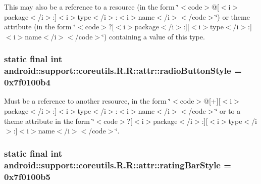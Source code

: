 This may also be a reference to a resource (in the form \char`\"{}$<$code$>$@\mbox{[}$<$i$>$package$<$/i$>$:\mbox{]}$<$i$>$type$<$/i$>$:$<$i$>$name$<$/i$>$$<$/code$>$\char`\"{}) or theme attribute (in the form \char`\"{}$<$code$>$?\mbox{[}$<$i$>$package$<$/i$>$:\mbox{]}\mbox{[}$<$i$>$type$<$/i$>$:\mbox{]}$<$i$>$name$<$/i$>$$<$/code$>$\char`\"{}) containing a value of this type. \hypertarget{classandroid_1_1support_1_1coreutils_1_1_r_1_1attr_57f616b66aedc31fe360f1557f94f519}{
\subsubsection[{radioButtonStyle}]{\setlength{\rightskip}{0pt plus 5cm}static final int android::support::coreutils.R.R::attr::radioButtonStyle = 0x7f0100b4}}
\label{classandroid_1_1support_1_1coreutils_1_1_r_1_1attr_57f616b66aedc31fe360f1557f94f519}


Must be a reference to another resource, in the form \char`\"{}$<$code$>$@\mbox{[}+\mbox{]}\mbox{[}$<$i$>$package$<$/i$>$:\mbox{]}$<$i$>$type$<$/i$>$:$<$i$>$name$<$/i$>$$<$/code$>$\char`\"{} or to a theme attribute in the form \char`\"{}$<$code$>$?\mbox{[}$<$i$>$package$<$/i$>$:\mbox{]}\mbox{[}$<$i$>$type$<$/i$>$:\mbox{]}$<$i$>$name$<$/i$>$$<$/code$>$\char`\"{}. \hypertarget{classandroid_1_1support_1_1coreutils_1_1_r_1_1attr_d2d3d429fd870d9daf633e1f2402963b}{
\subsubsection[{ratingBarStyle}]{\setlength{\rightskip}{0pt plus 5cm}static final int android::support::coreutils.R.R::attr::ratingBarStyle = 0x7f0100b5}}
\label{classandroid_1_1support_1_1coreutils_1_1_r_1_1attr_d2d3d429fd870d9daf633e1f2402963b}


